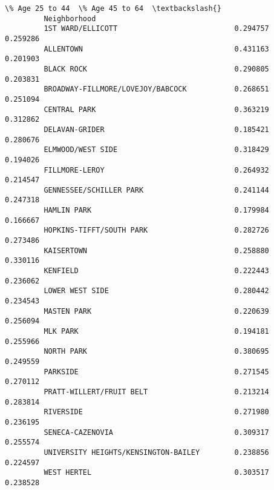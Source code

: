 \documentclass[11pt]{article}
\begin{document}
\begin{Verbatim}[commandchars=\\\{\}]
                                               \% Age 25 to 44  \% Age 45 to 64  \textbackslash{}
         Neighborhood                                                           
         1ST WARD/ELLICOTT                           0.294757        0.259286   
         ALLENTOWN                                   0.431163        0.201903   
         BLACK ROCK                                  0.290805        0.203831   
         BROADWAY-FILLMORE/LOVEJOY/BABCOCK           0.268651        0.251094   
         CENTRAL PARK                                0.363219        0.312862   
         DELAVAN-GRIDER                              0.185421        0.280676   
         ELMWOOD/WEST SIDE                           0.318429        0.194026   
         FILLMORE-LEROY                              0.264932        0.214547   
         GENNESSEE/SCHILLER PARK                     0.241144        0.247318   
         HAMLIN PARK                                 0.179984        0.166667   
         HOPKINS-TIFFT/SOUTH PARK                    0.282726        0.273486   
         KAISERTOWN                                  0.258880        0.330116   
         KENFIELD                                    0.222443        0.236062   
         LOWER WEST SIDE                             0.280442        0.234543   
         MASTEN PARK                                 0.220639        0.256094   
         MLK PARK                                    0.194181        0.255966   
         NORTH PARK                                  0.380695        0.249559   
         PARKSIDE                                    0.271545        0.270112   
         PRATT-WILLERT/FRUIT BELT                    0.213214        0.283814   
         RIVERSIDE                                   0.271980        0.236195   
         SENECA-CAZENOVIA                            0.309317        0.255574   
         UNIVERSITY HEIGHTS/KENSINGTON-BAILEY        0.238856        0.224597   
         WEST HERTEL                                 0.303517        0.238528   
         

\end{Verbatim}
\end{document}
